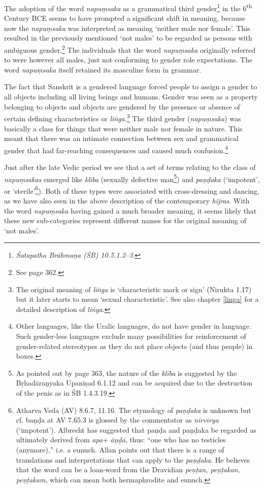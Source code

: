 The adoption of the word {\em napuṃsaka} as a grammatical third gender\footnote{{\em Śatapatha Brāhmaṇa (ŚB) 10.5.1.2–3}.} in the 6\textsuperscript{th} Century BCE seems to have prompted a significant shift in meaning, because now the {\em napuṃsaka} was interpreted as meaning `neither male nor female'. This resulted in the previously mentioned `not males' to be regarded as persons with ambiguous gender.\footnote{See \cite{zwilling2000} page 362.} The individuals that the word {\em napuṃsaka} originally referred to were however all males, just not conforming to gender role expectations. The word {\em napuṃsaka} itself retained its masculine form in grammar.

The fact that Sanskrit is a gendered language forced people to assign a gender to all objects including all living beings and humans. Gender was seen as a property belonging to objects and objects are gendered by the presence or absence of certain defining characteristics or {\em liṅga}.\footnote{The original meaning of {\em liṅga} is `characteristic mark or sign' (Nirukta 1.17) but it later starts to mean `sexual characteristic'. See also chapter \ref{linga} for a detailed description of {\em liṅga}.} The third gender ({\em napuṃsaka}) was basically a class for things that were neither male nor female in nature. This meant that there was an intimate connection between sex and grammatical gender that had far-reaching consequences and caused much confusion.\footnote{Other languages, like the Uralic languages, do not have gender in language. Such gender-less languages exclude many possibilities for reinforcement of gender-related stereotypes as they do not place objects (and thus people) in boxes.} 

Just after the late Vedic period we see that a set of terms relating to the class of {\em napuṃsakas} emerged like {\em klība} (sexually defective man\footnote{As pointed out by \cite{zwilling} page 363, the nature of the {\em klība} is suggested by the Bṛhadāraṇyaka Upaniṣad 6.1.12 and can be acquired due to the destruction of the penis as in ŚB 1.4.3.19.}) and {\em paṇḍaka} (`impotent', or `sterile'\footnote{Atharva Veda (AV) 8.6.7, 11.16. The etymology of {\em paṇḍaka} is unknown but cf. baṇḍa at AV 7.65.3 is glossed by the commentator as {\em nirvīrya} (`impotent'). Albrecht \cite{wezler} has suggested that paṇḍa and paṇḍaka be regarded as ultimately derived from {\em *apa}+ {\em āṇḍā}, thus: “one who has no testicles (anymore),” i.e. a eunuch. Allan \cite{bomhard} points out that there is a range of translations and interpretations that can apply to the {\em paṇḍaka}. He believes that the word can be a loan-word from the Dravidian {\em peṇṭan, peṇṭakan, peṇṭakam}, which can mean both hermaphrodite and eunuch.}). Both of these types were associated with cross-dressing and dancing, as we have also seen in the above description of the contemporary {\em hijras}. With the word {\em napuṃsaka} having gained a much broader meaning, it seems likely that these new sub-categories represent different names for the original meaning of `not males'.

